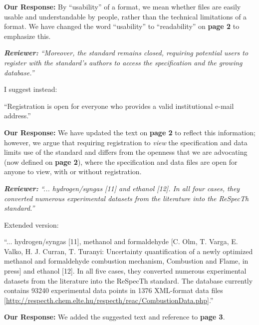 \documentclass[a4paper,10pt]{elsarticle}
\newenvironment{reviewer}{\vspace{0.5\baselineskip}\begingroup\itshape\textbf{Reviewer:}}{\endgroup}
\newenvironment{response}{\textbf{Our Response:}}{\vspace{0.5\baselineskip}}
\begin{document}
\begin{response}
    By ``usability'' of a format, we mean whether files are easily usable and understandable by
    people, rather than the technical limitations of a format. We have changed the word
    ``usability'' to ``readability'' on \textbf{page 2} to emphasize this.
\end{response}

\begin{reviewer}
    ``Moreover, the standard remains closed, requiring potential users to register with the
    standard's authors to access the specification and the growing database.''

    I suggest instead:

    ``Registration is open for everyone who provides a valid institutional e-mail address.''
\end{reviewer}

\begin{response}
    We have updated the text on \textbf{page 2} to reflect this information; however, we argue
    that requiring registration to \emph{view} the specification and data limits use
    of the standard and differs from the openness that we are advocating (now defined on \textbf{page 2}),
    where the specification and data files are open for anyone to view, with or without
    registration.
\end{response}

\begin{reviewer}
    ``... hydrogen/syngas [11] and ethanol [12]. In all four cases, they converted numerous
    experimental datasets from the literature into the ReSpecTh standard.''

    Extended version:

    ``... hydrogen/syngas [11], methanol and formaldehyde [C. Olm, T. Varga, E. Valko, H. J. Curran,
    T. Turanyi: Uncertainty quantification of a newly optimized methanol and formaldehyde combustion
    mechanism, Combustion and Flame, in press] and ethanol [12]. In all five cases, they converted
    numerous experimental datasets from the literature into the ReSpecTh standard. The database
    currently contains  93240 experimental data points in 1376 XML-format data files
    [\url{http://respecth.chem.elte.hu/respecth/reac/CombustionData.php}].''
\end{reviewer}

\begin{response}
    We added the suggested text and reference to \textbf{page 3}.
\end{response}
\end{document}
